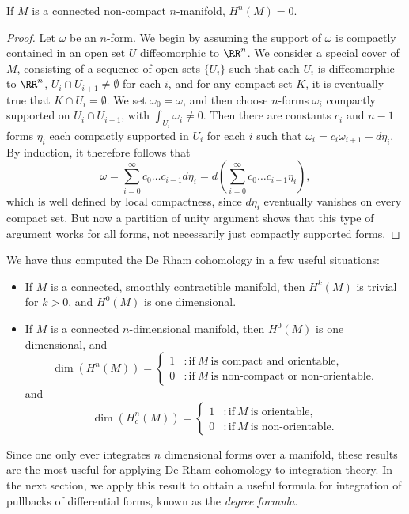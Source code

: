 \begin{theorem}
    If $M$ is a connected non-compact $n$-manifold, $H^n(M) = 0$.
\end{theorem}
\begin{proof}
    Let $\omega$ be an $n$-form. We begin by assuming the support of $\omega$ is compactly contained in an open set $U$ diffeomorphic to $\RR^n$. We consider a special cover of $M$, consisting of a sequence of open sets $\{ U_i \}$ such that each $U_i$ is diffeomorphic to $\RR^n$, $U_i \cap U_{i+1} \neq \emptyset$ for each $i$, and for any compact set $K$, it is eventually true that $K \cap U_i = \emptyset$. We set $\omega_0 = \omega$, and then choose $n$-forms $\omega_i$ compactly supported on $U_i \cap U_{i+1}$, with $\int_{U_i} \omega_i \neq 0$. Then there are constants $c_i$ and $n-1$ forms $\eta_i$ each compactly supported in $U_i$ for each $i$ such that $\omega_i = c_i \omega_{i+1} + d\eta_i$. By induction, it therefore follows that
    \[ \omega = \sum_{i = 0}^\infty c_0 \dots c_{i-1} d\eta_i = d \left( \sum_{i = 0}^\infty c_0 \dots c_{i-1} \eta_i \right), \]
    which is well defined by local compactness, since $d\eta_i$ eventually vanishes on every compact set. But now a partition of unity argument shows that this type of argument works for all forms, not necessarily just compactly supported forms.
\end{proof}

We have thus computed the De Rham cohomology in a few useful situations:
%
\begin{itemize}
    \item If $M$ is a connected, smoothly contractible manifold, then $H^k(M)$ is trivial for $k > 0$, and $H^0(M)$ is one dimensional.
    \item If $M$ is a connected $n$-dimensional manifold, then $H^0(M)$ is one dimensional, and
    \[ \dim(H^n(M)) = \begin{cases} 1 &: \text{if}\ M\ \text{is compact and orientable,} \\ 0 &: \text{if}\ M\ \text{is non-compact or non-orientable}. \end{cases} \]
    and
    \[ \dim(H^n_c(M)) = \begin{cases} 1 &: \text{if}\ M\ \text{is orientable,} \\ 0 &: \text{if}\ M\ \text{is non-orientable.} \end{cases} \]
\end{itemize}
%
Since one only ever integrates $n$ dimensional forms over a manifold, these results are the most useful for applying De-Rham cohomology to integration theory. In the next section, we apply this result to obtain a useful formula for integration of pullbacks of differential forms, known as the \emph{degree formula}.

